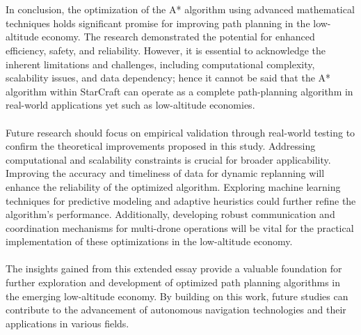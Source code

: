 \documentclass[12pt]{article}
\begin{document}
\\\\
In conclusion, the optimization of the A* algorithm using advanced mathematical techniques holds significant promise for improving path planning in the low-altitude economy. The research demonstrated the potential for enhanced efficiency, safety, and reliability. However, it is essential to acknowledge the inherent limitations and challenges, including computational complexity, scalability issues, and data dependency; hence it cannot be said that the A* algorithm within StarCraft can operate as a complete path-planning algorithm in real-world applications yet such as low-altitude economies.
\\\\
Future research should focus on empirical validation through real-world testing to confirm the theoretical improvements proposed in this study. Addressing computational and scalability constraints is crucial for broader applicability. Improving the accuracy and timeliness of data for dynamic replanning will enhance the reliability of the optimized algorithm. Exploring machine learning techniques for predictive modeling and adaptive heuristics could further refine the algorithm's performance. Additionally, developing robust communication and coordination mechanisms for multi-drone operations will be vital for the practical implementation of these optimizations in the low-altitude economy.
\\\\
The insights gained from this extended essay provide a valuable foundation for further exploration and development of optimized path planning algorithms in the emerging low-altitude economy. By building on this work, future studies can contribute to the advancement of autonomous navigation technologies and their applications in various fields.
\newpage
\end{document}
